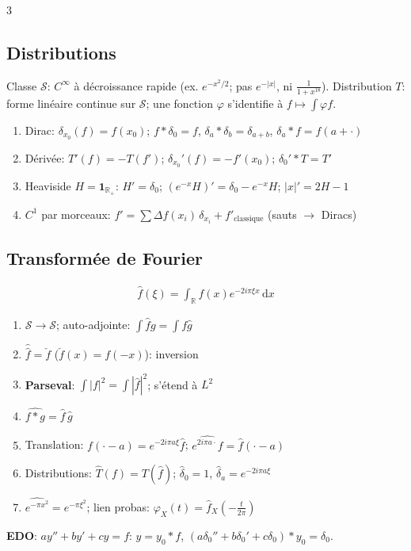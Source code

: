 \documentclass[12pt, a4paper]{article}
\newcommand{\dd}{\mathrm{d}}
\newcommand{\R}{\mathbb{R}}
\newcommand{\ind}{\mathbf{1}}
\begin{document}
\begin{multicols*}{3}
	\subsection{Distributions}
	Classe $\mathcal S$: $C^\infty$ à décroissance rapide (ex. $e^{-x^2/2}$; pas $e^{-|x|}$, ni $\frac1{1+x^{18}}$). Distribution $T$: forme linéaire continue sur $\mathcal S$; une fonction $\varphi$ s'identifie à $f\mapsto\int\varphi f$.
	\begin{enumerate}[\roman*.]
		\item Dirac: $\delta_{x_0}(f)=f(x_0)$; $f*\delta_0=f$, $\delta_a*\delta_b=\delta_{a+b}$, $\delta_a*f=f(a+\cdot)$
		\item Dérivée: $T'(f)=-T(f')$; $\delta_{x_0}'(f)=-f'(x_0)$; $\delta_0'*T=T'$
		\item Heaviside $H=\ind_{\R_+}$: $H'=\delta_0$; $(e^{-x}H)'=\delta_0-e^{-x}H$; $|x|'=2H-1$
		\item $C^1$ par morceaux: $f'=\sum\Delta f(x_i)\,\delta_{x_i}+f'_{\text{classique}}$ (sauts $\to$ Diracs)
	\end{enumerate}

	\subsection{Transformée de Fourier}
	\begin{gather*}
		\hat f(\xi)=\int_\R f(x)e^{-2i\pi\xi x}\,\dd x
	\end{gather*}
	\begin{enumerate}[\roman*.]
		\item $\mathcal S\to\mathcal S$; auto-adjointe: $\int\hat fg=\int f\hat g$
		\item $\hat{\hat f}=\check f$ ($\check f(x)=f(-x)$): inversion
		\item \textbf{Parseval}: $\int|f|^2=\int|\hat f|^2$; s'étend à $L^2$
		\item $\widehat{f*g}=\hat f\,\hat g$
		\item Translation: $\widehat{f(\cdot-a)}=e^{-2i\pi a\xi}\hat f$; $\widehat{e^{2i\pi a\cdot}f}=\hat f(\cdot-a)$
		\item Distributions: $\hat T(f)=T(\hat f)$; $\hat\delta_0=1$, $\hat\delta_a=e^{-2i\pi a\xi}$
		\item $\widehat{e^{-\pi x^2}}=e^{-\pi\xi^2}$; lien probas: $\varphi_X(t)=\hat f_X(-\frac t{2\pi})$
	\end{enumerate}
	\textbf{EDO}: $ay''+by'+cy=f$: $y=y_0*f$, $(a\delta_0''+b\delta_0'+c\delta_0)*y_0=\delta_0$.


\end{multicols*}
\end{document}
